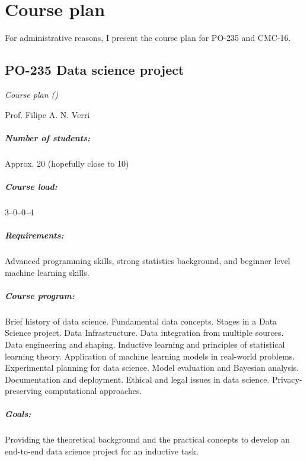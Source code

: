 \chapter*{Course plan}

For administrative reasons, I present the course plan for PO-235 and CMC-16.

\newpage
{}
\thispagestyle{empty}
\section*{PO-235 Data science project}

\emph{Course plan (\the\year{})}

Prof. Filipe A. N. Verri

\paragraph{Number of students:} Approx. 20 (hopefully close to 10)

\paragraph{Course load:} 3--0--0--4

\paragraph{Requirements:} Advanced programming skills, strong statistics background, and
beginner level machine learning skills.

\paragraph{Course program:}
Brief history of data science.  Fundamental data concepts. Stages in a Data Science
project.  Data Infrastructure. Data integration from multiple sources. Data engineering
and shaping.  Inductive learning and principles of statistical learning theory.
Application of machine learning models in real-world problems.  Experimental planning for
data science. Model evaluation and Bayesian analysis.  Documentation and deployment.
Ethical and legal issues in data science.  Privacy-preserving computational approaches.

\paragraph{Goals:}
Providing the theoretical background and the practical concepts to develop an end-to-end
data science project for an inductive task.

